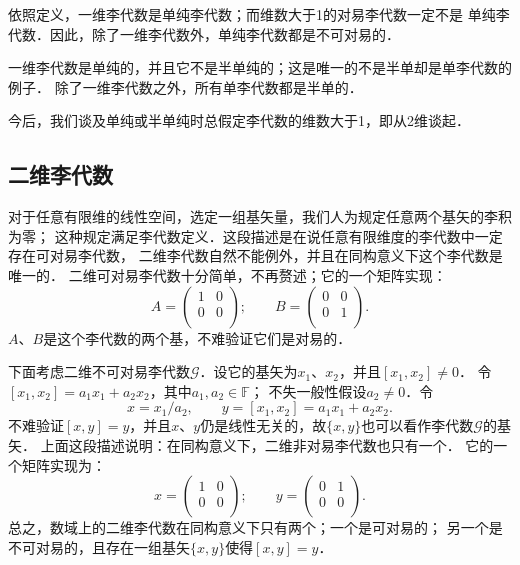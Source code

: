 依照定义，一维李代数是单纯李代数；而维数大于1的对易李代数一定不是
单纯李代数．因此，除了一维李代数外，单纯李代数都是不可对易的．

一维李代数是单纯的，并且它不是半单纯的；这是唯一的不是半单却是单李代数的例子．
除了一维李代数之外，所有单李代数都是半单的．

今后，我们谈及{\kaishu 单纯}或{\kaishu 半单纯}时总假定李代数的维数大于1，即从2维谈起．


\subsection{二维李代数}\label{chlg:sec_2DLA}

对于任意有限维的线性空间，选定一组基矢量，我们人为规定任意两个基矢的李积为零；
这种规定满足李代数定义．这段描述是在说任意有限维度的李代数中一定存在可对易李代数，
二维李代数自然不能例外，并且在同构意义下这个李代数是唯一的．
二维可对易李代数十分简单，不再赘述；它的一个矩阵实现：
\begin{equation}
A=\left(
\begin{array}{cc}
    1 & 0 \\
    0 & 0 \\
\end{array}\right);\qquad
B=\left(
\begin{array}{cc}
    0 & 0 \\
    0 & 1 \\
\end{array}
\right).
\end{equation}
$A$、$B$是这个李代数的两个基，不难验证它们是对易的．


下面考虑二维不可对易李代数$\mathscr{G}$．设它的基矢为$x_1$、$x_2$，并且$[x_1,x_2]\neq 0$．
令$[x_1,x_2]= a_1 x_1+ a_2 x_2$，其中$a_1,a_2\in \mathbb{F}$；
不失一般性假设$a_2\neq 0$．令
\begin{equation}
    x = x_1 / a_2,\qquad
    y = [x_1,x_2]= a_1 x_1+ a_2 x_2.
\end{equation}
不难验证$[x,y]=y$，并且$x$、$y$仍是线性无关的，故$\{x,y\}$也可以看作李代数$\mathscr{G}$的基矢．
上面这段描述说明：在同构意义下，二维非对易李代数也只有一个．
它的一个矩阵实现为：
\begin{equation}
    x=\left(
    \begin{array}{cc}
        1 & 0 \\
        0 & 0 \\
    \end{array}\right);\qquad
    y=\left(
    \begin{array}{cc}
        0 & 1 \\
        0 & 0 \\
    \end{array}
    \right).
\end{equation}
总之，数域上的二维李代数在同构意义下只有两个；一个是可对易的；
另一个是不可对易的，且存在一组基矢$\{x,y\}$使得$[x,y]=y$．

